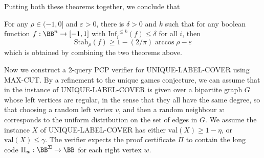 Putting both these theorems together, we conclude that

\begin{theorem}
    For any $\rho \in (-1,0]$ and $\varepsilon > 0$, there is $\delta > 0$ and $k$ such that for any boolean function $f: \BB^n \to [-1,1]$ with $\text{Inf}_i^{\ \leq k}(f) \leq \delta$ for all $i$, then
    \[ \text{Stab}_\rho(f) \geq 1 - (2/\pi) \arccos \rho - \varepsilon \]
    which is obtained by combining the two theorems above.
\end{theorem}

Now we construct a 2-query PCP verifier for UNIQUE-LABEL-COVER using MAX-CUT. By a refinement to the unique games conjecture, we can assume that in the instance of UNIQUE-LABEL-COVER is given over a bipartite graph $G$ whose left vertices are regular, in the sense that they all have the same degree, so that choosing a random left vertex $v$, and then a random neighbour $w$ corresponds to the uniform distribution on the set of edges in $G$. We assume the instance $X$ of UNIQUE-LABEL-COVER has either $\text{val}(X) \geq 1 - \eta$, or $\text{val}(X) \leq \gamma$. The verifier expects the proof certificate $\Pi$ to contain the long code $\Pi_w: \BB^\Sigma \to \BB$ for each right vertex $w$.


